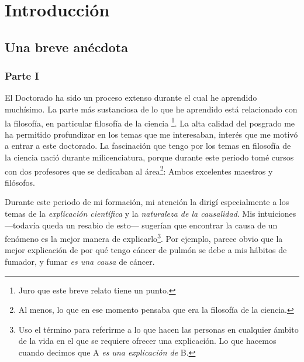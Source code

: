 
\chapter*{Introducción}\label{ch:introduction}

\section*{Una breve anécdota}

\subsection{Parte I}

\noindent El Doctorado ha sido un proceso extenso durante el cual he
aprendido muchísimo. La parte más sustanciosa de lo que he aprendido está
relacionado con la filosofía, en particular filosofía de la ciencia
\footnote{
	Juro que este breve relato tiene un punto.
}.
La alta calidad del posgrado me ha permitido profundizar en los temas  que
me interesaban, interés que me motivó a entrar a este doctorado. La
fascinación que tengo por los temas en filosofía de la ciencia nació
durante milicenciatura, porque durante este periodo tomé cursos con dos
profesores que se dedicaban al área\footnote{
	Al menos, lo que en ese momento pensaba que era la filosofía de la
	ciencia.
}:
Ambos excelentes maestros y filósofos.

Durante este periodo de mi formación, mi atención la dirigí especialmente
a los temas de la \emph{explicación científica} y la \emph{naturaleza de
	la causalidad}. Mis intuiciones ---todavía queda un resabio de esto---
sugerían que encontrar la causa de un fenómeno es la mejor manera de
explicarlo\footnote{
	Uso el término para referirme a lo que hacen las personas en cualquier
	ámbito de la vida en el que se requiere ofrecer una explicación. Lo que
	hacemos cuando decimos que A \emph{es una explicación de} B.
}.
Por ejemplo, parece obvio que la mejor explicación de por qué tengo cáncer
de pulmón se debe a mis hábitos de fumador, y fumar \emph{es una causa} de
cáncer.

